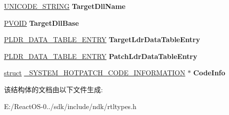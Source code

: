 \begin{DoxyCompactItemize}
\item 
\mbox{\label{struct___r_t_l___p_a_t_c_h___h_e_a_d_e_r_aea190ebbed076c4890030efc3cd741a9}} 
\hyperlink{struct___u_n_i_c_o_d_e___s_t_r_i_n_g}{U\+N\+I\+C\+O\+D\+E\+\_\+\+S\+T\+R\+I\+NG} {\bfseries Target\+Dll\+Name}
\item 
\mbox{\label{struct___r_t_l___p_a_t_c_h___h_e_a_d_e_r_a3da4a475c405154ed1eb00a6270d3e80}} 
\hyperlink{interfacevoid}{P\+V\+O\+ID} {\bfseries Target\+Dll\+Base}
\item 
\mbox{\label{struct___r_t_l___p_a_t_c_h___h_e_a_d_e_r_a81aa4d79eda03656ab9a763a4e697aaa}} 
\hyperlink{struct___l_d_r___d_a_t_a___t_a_b_l_e___e_n_t_r_y}{P\+L\+D\+R\+\_\+\+D\+A\+T\+A\+\_\+\+T\+A\+B\+L\+E\+\_\+\+E\+N\+T\+RY} {\bfseries Target\+Ldr\+Data\+Table\+Entry}
\item 
\mbox{\label{struct___r_t_l___p_a_t_c_h___h_e_a_d_e_r_ad34544f8dac7b157d741b3b7f91e10d3}} 
\hyperlink{struct___l_d_r___d_a_t_a___t_a_b_l_e___e_n_t_r_y}{P\+L\+D\+R\+\_\+\+D\+A\+T\+A\+\_\+\+T\+A\+B\+L\+E\+\_\+\+E\+N\+T\+RY} {\bfseries Patch\+Ldr\+Data\+Table\+Entry}
\item 
\mbox{\label{struct___r_t_l___p_a_t_c_h___h_e_a_d_e_r_ade925ca48af91743795a548c0b315f63}} 
\hyperlink{interfacestruct}{struct} \hyperlink{struct___s_y_s_t_e_m___h_o_t_p_a_t_c_h___c_o_d_e___i_n_f_o_r_m_a_t_i_o_n}{\+\_\+\+S\+Y\+S\+T\+E\+M\+\_\+\+H\+O\+T\+P\+A\+T\+C\+H\+\_\+\+C\+O\+D\+E\+\_\+\+I\+N\+F\+O\+R\+M\+A\+T\+I\+ON} $\ast$ {\bfseries Code\+Info}
\end{DoxyCompactItemize}


该结构体的文档由以下文件生成\+:\begin{DoxyCompactItemize}
\item 
E\+:/\+React\+O\+S-\/0../sdk/include/ndk/rtltypes.\+h\end{DoxyCompactItemize}
